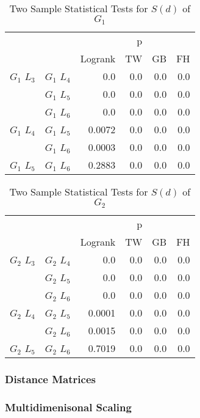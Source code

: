      
  \begin{table}
        \centering
        \begin{tabular}{llrrrr}
          \toprule
                       &             &         &  p &    &     \\
          \cmidrule{3-6}
                       &             & Logrank & TW & GB & FH  \\
          \midrule
          $G_1$ $L_3$  & $G_1$ $L_4$  &  0.0 &  0.0 &  0.0 &  0.0     \\
                       & $G_1$ $L_5$  & 0.0 & 0.0 & 0.0 & 0.0    \\
                       & $G_1$ $L_6$  & 0.0 & 0.0 & 0.0 & 0.0      \\
          $G_1$ $L_4$  & $G_1$ $L_5$  & 0.0072 & 0.0 & 0.0 & 0.0      \\
                       & $G_1$ $L_6$  & 0.0003 & 0.0 & 0.0 & 0.0       \\
          $G_1$ $L_5$   & $G_1$ $L_6$ & 0.2883 &  0.0 & 0.0 & 0.0      \\
          \bottomrule
        \end{tabular}
        \label{tab:g1_ingroup_tests_disp}
        \caption{Two Sample Statistical Tests for $S(d)$ of $G_1$}
      \end{table}


      \begin{table}
        \centering
        \begin{tabular}{llrrrr}
          \toprule
                       &             &         &  p &    &     \\
          \cmidrule{3-6}
                       &             & Logrank & TW & GB & FH  \\
          \midrule
          $G_2$ $L_3$  & $G_2$ $L_4$  &  0.0 &  0.0 &  0.0 &  0.0     \\
                       & $G_2$ $L_5$  & 0.0 & 0.0 & 0.0 & 0.0    \\
                       & $G_2$ $L_6$  & 0.0 & 0.0 & 0.0 & 0.0      \\
          $G_2$ $L_4$  & $G_2$ $L_5$  & 0.0001 & 0.0 & 0.0 & 0.0      \\
                       & $G_2$ $L_6$  & 0.0015 & 0.0 & 0.0 & 0.0       \\
          $G_2$ $L_5$   & $G_2$ $L_6$ & 0.7019 &  0.0 & 0.0 & 0.0      \\
          \bottomrule
        \end{tabular}
        \label{tab:g2_ingroup_tests_disp}
        \caption{Two Sample Statistical Tests for $S(d)$ of $G_2$}
      \end{table}

      



\subsubsection{Distance Matrices}




\subsubsection{Multidimenisonal Scaling}

